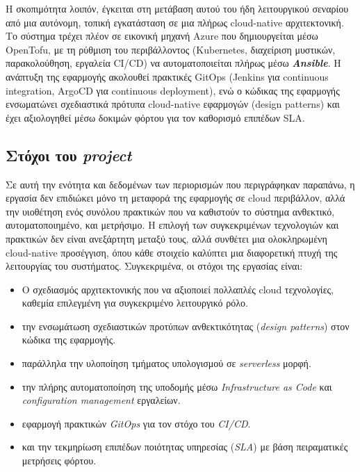 Η σκοπιμότητα λοιπόν, έγκειται στη μετάβαση αυτού του ήδη λειτουργικού σεναρίου από μια αυτόνομη, τοπική εγκατάσταση σε μια πλήρως cloud-native αρχιτεκτονική. Το σύστημα τρέχει πλέον σε εικονική μηχανή Azure που δημιουργείται μέσω OpenTofu, με τη ρύθμιση του περιβάλλοντος (Kubernetes, διαχείριση μυστικών, παρακολούθηση, εργαλεία CI/CD) να αυτοματοποιείται πλήρως μέσω \textbf{\textit{Ansible}}. Η ανάπτυξη της εφαρμογής ακολουθεί πρακτικές GitOps (Jenkins για continuous integration, ArgoCD για continuous deployment), ενώ ο κώδικας της εφαρμογής ενσωματώνει σχεδιαστικά πρότυπα cloud-native εφαρμογών (design patterns) και έχει αξιολογηθεί μέσω δοκιμών φόρτου για τον καθορισμό επιπέδων SLA.

\subsection{Στόχοι του \textit{project}}

Σε αυτή την ενότητα και δεδομένων των περιορισμών που περιγράφηκαν παραπάνω, η εργασία δεν επιδιώκει μόνο τη μεταφορά της εφαρμογής σε cloud περιβάλλον, αλλά την υιοθέτηση ενός συνόλου πρακτικών που να καθιστούν το σύστημα ανθεκτικό, αυτοματοποιημένο, και μετρήσιμο. Η επιλογή των συγκεκριμένων τεχνολογιών και πρακτικών δεν είναι ανεξάρτητη μεταξύ τους, αλλά συνθέτει μια ολοκληρωμένη cloud-native προσέγγιση, όπου κάθε στοιχείο καλύπτει μια διαφορετική πτυχή της λειτουργίας του συστήματος. Συγκεκριμένα, οι στόχοι της εργασίας είναι:

\begin{itemize}
  \item Ο σχεδιασμός αρχιτεκτονικής που να αξιοποιεί πολλαπλές cloud τεχνολογίες, καθεμία επιλεγμένη για συγκεκριμένο λειτουργικό ρόλο.
  \item την ενσωμάτωση σχεδιαστικών προτύπων ανθεκτικότητας (\textit{design patterns}) στον κώδικα της εφαρμογής.
  \item παράλληλα την υλοποίηση τμήματος υπολογισμού σε \textit{serverless} μορφή.
  \item την πλήρης αυτοματοποίηση της υποδομής μέσω \textit{Infrastructure as Code} και \textit{configuration management} εργαλείων.
  \item εφαρμογή πρακτικών \textit{GitOps} για τον στόχο του \textit{CI/CD}.
  \item και την τεκμηρίωση επιπέδων ποιότητας υπηρεσίας (\textit{SLA}) με βάση πειραματικές μετρήσεις φόρτου.
\end{itemize}


